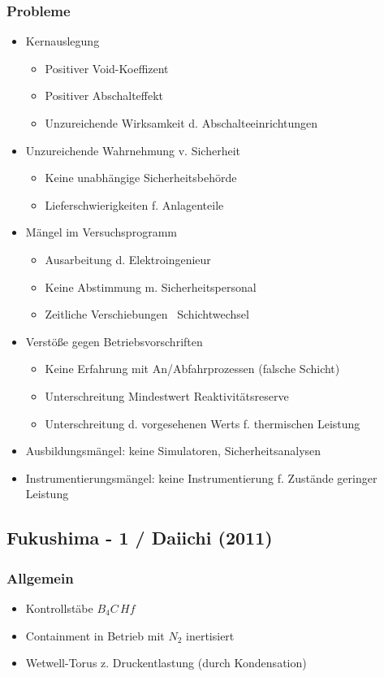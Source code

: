 \documentclass[12pt]{article}
\begin{document}
\subsubsection{Probleme}
\begin{itemize}
	\item Kernauslegung
		\begin{itemize}
			\item Positiver Void-Koeffizent
			\item Positiver Abschalteffekt
			\item Unzureichende Wirksamkeit d. Abschalteeinrichtungen
		\end{itemize}
	\item Unzureichende Wahrnehmung v. Sicherheit
		\begin{itemize}
			\item Keine unabhängige Sicherheitsbehörde
			\item Lieferschwierigkeiten f. Anlagenteile
		\end{itemize}
	\item Mängel im Versuchsprogramm
		\begin{itemize}
			\item Ausarbeitung d. Elektroingenieur
			\item Keine Abstimmung m. Sicherheitspersonal
			\item Zeitliche Verschiebungen \textrightarrow\ Schichtwechsel
		\end{itemize}
	\item Verstöße gegen Betriebsvorschriften
		\begin{itemize}
			\item Keine Erfahrung mit An/Abfahrprozessen (falsche Schicht)
			\item Unterschreitung Mindestwert Reaktivitätsreserve
			\item Unterschreitung d. vorgesehenen Werts f. thermischen Leistung
		\end{itemize}
	\item Ausbildungsmängel: keine Simulatoren, Sicherheitsanalysen
	\item Instrumentierungsmängel: keine Instrumentierung f. Zustände geringer Leistung
\end{itemize}

\subsection{Fukushima - 1 / Daiichi (2011)}

\subsubsection{Allgemein}
\begin{itemize}
	\item Kontrollstäbe \(B_4C\, Hf\)
	\item Containment in Betrieb mit \(N_2\) inertisiert
	\item Wetwell-Torus z. Druckentlastung (durch Kondensation)
\end{itemize}
\end{document}
